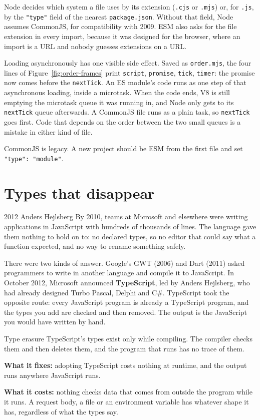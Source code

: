 Node decides which system a file uses by its extension (\texttt{.cjs} or
\texttt{.mjs}) or, for \texttt{.js}, by the \texttt{"type"} field of the nearest
\texttt{package.json}. Without that field, Node assumes CommonJS, for
compatibility with 2009. ESM also asks for the file extension in every import,
because it was designed for the browser, where an import is a URL and nobody
guesses extensions on a URL.

Loading asynchronously has one visible side effect. Saved as \texttt{order.mjs},
the four lines of Figure~\ref{fig:order-frames} print \texttt{script},
\texttt{promise}, \texttt{tick}, \texttt{timer}: the promise now comes before
the \texttt{nextTick}. An ES module's code runs as one step of that
asynchronous loading, inside a microtask. When the code ends, V8 is still
emptying the microtask queue it was running in, and Node only gets to its
\texttt{nextTick} queue afterwards. A CommonJS file runs as a plain task, so
\texttt{nextTick} goes first. Code that depends on the order between the two
small queues is a mistake in either kind of file.

CommonJS is legacy. A new project should be ESM from the first file and set
\texttt{"type": "module"}.

\section{Types that disappear}

\begin{history}{2012 \textperiodcentered{} Anders Hejlsberg}
By 2010, teams at Microsoft and elsewhere were writing applications in
JavaScript with hundreds of thousands of lines. The language gave them nothing
to hold on to: no declared types, so no editor that could say what a function
expected, and no way to rename something safely.

There were two kinds of answer. Google's GWT (2006) and Dart (2011) asked
programmers to write in another language and compile it to JavaScript. In
October 2012, Microsoft announced \textbf{TypeScript}, led by Anders Hejlsberg,
who had already designed Turbo Pascal, Delphi and C\#. TypeScript took the
opposite route: every JavaScript program is already a TypeScript program, and
the types you add are checked and then removed. The output is the JavaScript
you would have written by hand.
\end{history}

\begin{concept}{Type erasure}
TypeScript's types exist only while compiling. The compiler checks them and
then deletes them, and the program that runs has no trace of them.

\textbf{What it fixes:} adopting TypeScript costs nothing at runtime, and the
output runs anywhere JavaScript runs.

\textbf{What it costs:} nothing checks data that comes from outside the program
while it runs. A request body, a file or an environment variable has whatever
shape it has, regardless of what the types say.
\end{concept}

